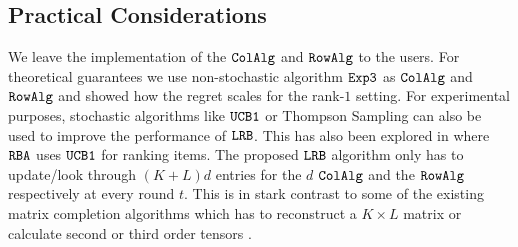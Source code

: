\subsection{Practical Considerations}
\label{sec:practical considerations}




We leave the implementation of the ${\tt ColAlg}$ and ${\tt RowAlg}$ to the users. For theoretical guarantees  we use non-stochastic algorithm ${\tt Exp3}$ as ${\tt ColAlg}$ and ${\tt RowAlg}$ and showed how the regret scales for the rank-$1$ setting. For experimental purposes, stochastic algorithms like ${\tt UCB1}$ or Thompson Sampling can also be used to improve the performance of ${\tt LRB}$. This has also been explored in \citet{radlinski2008learning} where ${\tt RBA}$ uses ${\tt UCB1}$ for ranking items. The proposed ${\tt LRB}$ algorithm only has to update/look  through $(K + L)d$ entries for the $d$ ${\tt ColAlg}$ and the ${\tt RowAlg}$ respectively at every round $t$. This is in stark contrast to some of the existing matrix completion algorithms which has to reconstruct a $K\times L$ matrix \citep{sen2016contextual} or calculate second or third order tensors \citep{gopalan2016low}. 


